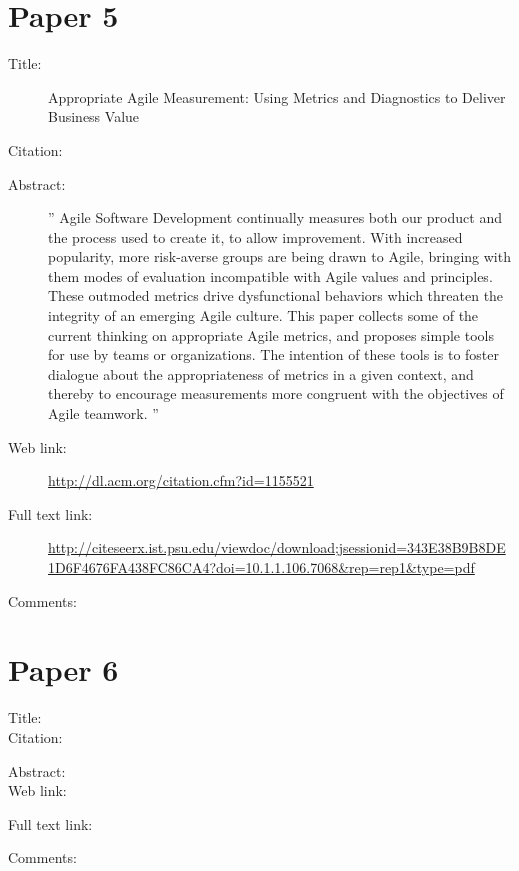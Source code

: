 \documentclass{scrartcl}
\begin{document}
\section*{Paper 5}
\begin{description}
	\item[Title:] Appropriate Agile Measurement: Using Metrics and Diagnostics to Deliver Business Value
	\item[Citation:] \cite{Hartmann}
	\item[Abstract:] '' Agile Software Development continually measures both our product and the process used to create it, to allow improvement. With increased popularity, more risk-averse groups are being drawn to Agile, bringing with them modes of evaluation incompatible with Agile values and principles. These outmoded metrics drive dysfunctional behaviors which threaten the integrity of an emerging Agile culture. This paper collects some of the current thinking on appropriate Agile metrics, and proposes simple tools for use by teams or organizations. The intention of these tools is to foster dialogue about the appropriateness of metrics in a given context, and thereby to encourage measurements more congruent with the objectives of Agile teamwork. ''
	\item[Web link:] \url{http://dl.acm.org/citation.cfm?id=1155521}
	\item[Full text link:] \url{http://citeseerx.ist.psu.edu/viewdoc/download;jsessionid=343E38B9B8DE1D6F4676FA438FC86CA4?doi=10.1.1.106.7068&rep=rep1&type=pdf}
	\item[Comments:] 
\end{description}

\section*{Paper 6}
\begin{description}
	\item[Title:]
	\item[Citation:] \cite{}
	\item[Abstract:]
	\item[Web link:] \url{}
	\item[Full text link:] \url{}
	\item[Comments:] 
\end{description}




\end{document}
